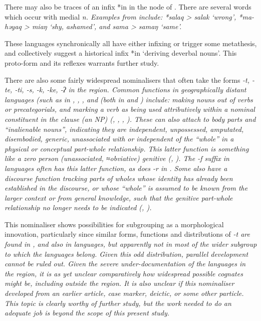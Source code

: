 There may also be traces of an infix *\<in\> in the
 node of .
There are several words which
occur with medial \it{n}.
Examples from \citet{Fricke2019} include:
*salaq >  \it{salak} `wrong',
*ma-həyaq >  \it{miaŋ} `shy, ashamed',
and  \it{sama} >  \it{samaŋ} `same'.

These languages synchronically all have either infixing or trigger
some metathesis, and collectively suggest a historical infix *\<in\> ‘deriving deverbal nouns’.
This proto-form and its reflexes warrants further study.

There are also some fairly widespread nominalisers that often
take the forms \it{-t, -te, -ti, -s, -k, -ke, -ʔ} in the region.
Common functions in geographically distant languages (such as
in , , , and   (both in 
and ) include: making nouns out of verbs
or precategorials, and marking a verb as being used attributively within a nominal
constituent in the clause (an NP)
(\citealp{Jonker1906}, \citealp[30--33]{Collins1983}, \citealp[101--104, 143--145, 180--182]{Grimes1991c}, \citealp{Tamelan2021}).
These can also attach to body parts
and “inalienable nouns”, indicating they are independent,
unpossessed, amputated, disembodied, generic,
unassociated with or independent of the “whole” in a physical
or conceptual part-whole relationship.
This latter function is something like a zero person (unassociated, ≈obviative)
genitive (\citealp[442]{Edwards2020}, \citealp{Tamelan2021}).
The \it{-f} suffix in  languages often has this latter
function, as does \it{-r} in .
Some also have a discourse function tracking parts of wholes
whose identity has already been established in the discourse,
or whose “whole” is assumed to be known from the larger context
or from general knowledge,
such that the genitive part-whole relationship no longer needs
to be indicated (\citealp[288f]{Grimes1991c}, \citealp[617f]{Grimes2024}).

This nominaliser shows possibilities for subgrouping as a morphological
innovation, particularly since similar forms,
functions and distributions of \it{-t} are found in ,
 and also in  languages,
but apparently not in most of the wider  subgroup
to which the  languages belong.
Given this odd distribution,
parallel development cannot be ruled out.
Given the severe under-documentation of the languages in the
region, it is as yet unclear comparatively how widespread possible cognates
might be, including outside the region.
It is also unclear if this nominaliser developed from an earlier
article, case marker, deictic, or some other particle.
This topic is clearly worthy of further study,
but the work needed to do an adequate job is beyond the scope
of this present study.

